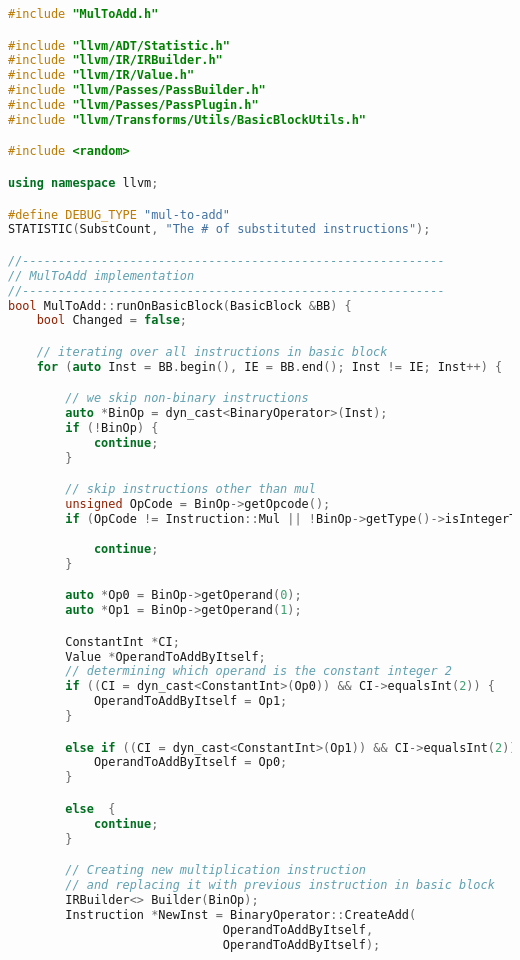 \documentclass[16pt]{article}
\begin{document}
\vspace{2.5pt}
\begin{lstlisting}[caption=Implementation of MulToAdd.cpp, label=mul-to-add-implementation,
style=chstyle,language=C++]
#include "MulToAdd.h"

#include "llvm/ADT/Statistic.h"
#include "llvm/IR/IRBuilder.h"
#include "llvm/IR/Value.h"
#include "llvm/Passes/PassBuilder.h"
#include "llvm/Passes/PassPlugin.h"
#include "llvm/Transforms/Utils/BasicBlockUtils.h"

#include <random>

using namespace llvm;

#define DEBUG_TYPE "mul-to-add"
STATISTIC(SubstCount, "The # of substituted instructions");

//-----------------------------------------------------------
// MulToAdd implementation
//-----------------------------------------------------------
bool MulToAdd::runOnBasicBlock(BasicBlock &BB) {
    bool Changed = false; 

    // iterating over all instructions in basic block 
    for (auto Inst = BB.begin(), IE = BB.end(); Inst != IE; Inst++) {

        // we skip non-binary instructions 
        auto *BinOp = dyn_cast<BinaryOperator>(Inst);
        if (!BinOp) {
            continue;
        }

        // skip instructions other than mul
        unsigned OpCode = BinOp->getOpcode();
        if (OpCode != Instruction::Mul || !BinOp->getType()->isIntegerTy()) {
            
            continue;
        }

        auto *Op0 = BinOp->getOperand(0);
        auto *Op1 = BinOp->getOperand(1);

        ConstantInt *CI;
        Value *OperandToAddByItself; 
        // determining which operand is the constant integer 2
        if ((CI = dyn_cast<ConstantInt>(Op0)) && CI->equalsInt(2)) {
            OperandToAddByItself = Op1;
        }

        else if ((CI = dyn_cast<ConstantInt>(Op1)) && CI->equalsInt(2)) {
            OperandToAddByItself = Op0; 
        }

        else  {
            continue; 
        }

        // Creating new multiplication instruction 
        // and replacing it with previous instruction in basic block
        IRBuilder<> Builder(BinOp);
        Instruction *NewInst = BinaryOperator::CreateAdd(
                              OperandToAddByItself,
                              OperandToAddByItself);


\end{lstlisting}
\end{document}
